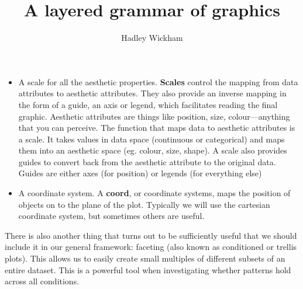 \begin{itemize}
  \item A scale for all the aesthetic properties.  {\bf Scales} control the mapping from data attributes to aesthetic attributes.  They also provide an inverse mapping in the form of a guide, an axis or legend, which facilitates reading the final graphic.  Aesthetic attributes are things like position, size, colour---anything that you can perceive.  The function that maps data to aesthetic attributes is a scale. It takes values in data space (continuous or categorical) and maps them into an aesthetic space (eg. colour, size, shape).  A scale also provides guides to convert back from the aesthetic attribute to the original data.  Guides are either axes (for position) or legends (for everything else)

  \item A coordinate system.  A {\bf coord}, or coordinate systems, maps the position of objects on to the plane of the plot.  Typically we will use the cartesian coordinate system, but sometimes others are useful.
\end{itemize}

There is also another thing that turns out to be sufficiently useful that we should include it in our general framework: faceting (also known as conditioned or trellis plots). This allows us to easily create small multiples of different subsets of an entire dataset. This is a powerful tool when investigating whether patterns hold across all conditions.

\usepackage{fullpage}
\usepackage[utf8]{inputenc}
\usepackage[pdftex]{graphicx}
\graphicspath{{2007-jcgs/}}
\usepackage{hyperref}
\usepackage{pdfsync}
\usepackage{alltt}
\usepackage{url}
\usepackage[round,sectionbib]{natbib}
\usepackage{setspace} 
\doublespacing

\title{A layered grammar of graphics}
\author{Hadley Wickham}

\maketitle

